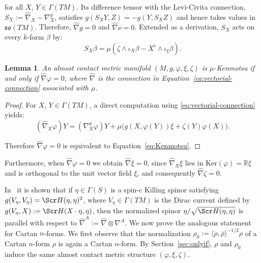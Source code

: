 \documentclass[10pt,a4paper,twoside,reqno]{amsart}
\theoremstyle{plain}
\newtheorem{lemma}[thm]{Lemma}
\theoremstyle{definition}
\theoremstyle{remark}
\def\R{\mathbb{R}}
\def\scS{\Scr H}
\def\R{\mathbb{R}}
\newcommand{\escal}[1]{\langle#1\rangle}
\renewcommand{\ker}{\mathrm{Ker}}
\begin{document}
\noindent
for all $X$, $Y \in \Gamma(TM)$. Its difference tensor with the Levi-Civita connection, $S_X := \hat\nabla_X - \nabla^g_X$, satisfies $g(S_XY,Z)=-g(Y,S_XZ)$ and hence takes values in $\mathfrak{so}(TM)$. Therefore, $\hat\nabla g=0$ and $\hat\nabla\nu=0$. Extended as a derivation, $S_X$ acts on every $k$-form $\beta$ by:
\begin{equation}
\label{eq:difference-forms}
    S_X\beta = \mu (\zeta \wedge \iota_X \beta - X^\flat \wedge \iota_\xi \beta).
\end{equation}

\begin{lemma}
\label{lemma:vectorial-Kenmotsu}
An almost contact metric manifold $(M,g,\varphi,\xi,\zeta)$ is $\mu$-Kenmotsu if and only if $\hat\nabla\varphi=0$, where $\hat\nabla$ is the connection in Equation~\eqref{eq:vectorial-connection} associated with $\mu$.
\end{lemma}

\begin{proof}
For $X$, $Y\in \Gamma(TM)$, a direct computation using
\eqref{eq:vectorial-connection} yields:
\begin{equation*}
    (\hat\nabla_X\varphi)Y=(\nabla^g_X\varphi)Y+\mu\big(g(X,\varphi (Y))\xi+\zeta(Y)\varphi(X)\big).
\end{equation*}

\noindent
Therefore $\hat\nabla\varphi = 0$ is equivalent to Equation~\eqref{eq:Kenmotsu}.
\end{proof}

Furthermore, when $\hat\nabla\varphi = 0$ we obtain $\hat\nabla\xi = 0$, since $\hat\nabla_X\xi$ lies in $\ker(\varphi)=\R\xi$ and is orthogonal to the unit vector field $\xi$, and consequently $\hat\nabla\zeta = 0$.\medskip

\noindent
In~\cite[Thm.~5.1]{C2026} it is shown that if $\eta\in\Gamma(S)$ is a spin-c Killing spinor satisfying $g(V_\eta,V_\eta) = \scS (\eta,\eta)^2$, where $V_\eta\in\Gamma(TM)$ is the Dirac current defined by $g(V_\eta, X) := \scS(X \cdot \eta, \eta)$, then the normalized spinor $\eta/\sqrt{\scS(\eta,\eta)}$ is parallel with respect to $\hat\nabla^A := \hat\nabla \otimes \nabla^A$. We now prove the analogous statement for Cartan $n$-forms. We first observe that the normalization $\rho_0:=\escal{\rho,\overline{\rho}}^{-1/2}\rho$ of a Cartan $n$-form $\rho$ is again a Cartan $n$-form. By Section~\ref{sec:onlyif}, $\rho$ and $\rho_0$ induce the same almost contact metric structure $(\varphi, \xi, \zeta)$.
\end{document}
